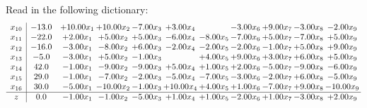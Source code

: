\documentclass[9pt]{article}
\begin{document}
Read in the following dictionary:
\[\begin{array}{c| c c@{\hskip 2pt} c@{\hskip 2pt} c@{\hskip 2pt} c@{\hskip 2pt} c@{\hskip 2pt} c@{\hskip 2pt} c@{\hskip 2pt} c@{\hskip 2pt} c@{\hskip 2pt} }
 x_{10}   &  -13.0 & + 10.00 x_{1} & + 10.00 x_{2} & -7.00 x_{3} & +  3.00 x_{4} &   & -3.00 x_{6} & +  9.00 x_{7} & -3.00 x_{8} & -2.00 x_{9}\\
 x_{11}   &  -22.0 & +  2.00 x_{1} & +  5.00 x_{2} & +  5.00 x_{3} & -6.00 x_{4} & -8.00 x_{5} & -7.00 x_{6} & +  5.00 x_{7} & -7.00 x_{8} & +  5.00 x_{9}\\
 x_{12}   &  -16.0 & -3.00 x_{1} & -8.00 x_{2} & +  6.00 x_{3} & -2.00 x_{4} & -2.00 x_{5} & -2.00 x_{6} & -1.00 x_{7} & +  5.00 x_{8} & +  9.00 x_{9}\\
 x_{13}   &  -5.0 & -3.00 x_{1} & +  5.00 x_{2} & -1.00 x_{3} &   & +  4.00 x_{5} & +  9.00 x_{6} & +  3.00 x_{7} & +  6.00 x_{8} & +  5.00 x_{9}\\
 x_{14}   &  42.0 & -1.00 x_{1} & -9.00 x_{2} & -9.00 x_{3} & +  5.00 x_{4} & +  1.00 x_{5} & +  2.00 x_{6} & -5.00 x_{7} & -9.00 x_{8} & -6.00 x_{9}\\
 x_{15}   &  29.0 & -1.00 x_{1} & -7.00 x_{2} & -2.00 x_{3} & -5.00 x_{4} & -7.00 x_{5} & -3.00 x_{6} & -2.00 x_{7} & +  6.00 x_{8} & -5.00 x_{9}\\
 x_{16}   &  30.0 & -5.00 x_{1} & -10.00 x_{2} & -1.00 x_{3} & + 10.00 x_{4} & +  4.00 x_{5} & +  1.00 x_{6} & -7.00 x_{7} & +  9.00 x_{8} & -10.00 x_{9}\\
\hline
z    &  0.0 & -1.00 x_{1} & -1.00 x_{2} & -5.00 x_{3} & +  1.00 x_{4} & +  1.00 x_{5} & -2.00 x_{6} & +  1.00 x_{7} & -3.00 x_{8} & +  2.00 x_{9}\\
\end{array}\]
\end{document}
